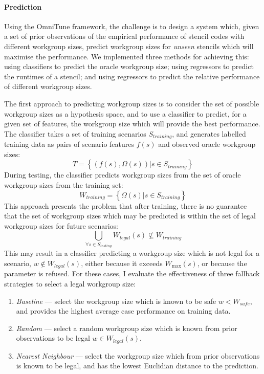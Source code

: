 \documentclass[nonatbib,preprint,9pt]{sigplanconf}
\begin{document}
\paragraph{Prediction} Using the OmniTune framework, the challenge is
to design a system which, given a set of prior observations of the
empirical performance of stencil codes with different workgroup sizes,
predict workgroup sizes for \emph{unseen} stencils which will maximise
the performance. We implemented three methods for achieving this:
using classifiers to predict the oracle workgroup size; using
regressors to predict the runtimes of a stencil; and using regressors
to predict the relative performance of different workgroup sizes.

The first approach to predicting workgroup
sizes is to consider the set of possible workgroup sizes as a
hypothesis space, and to use a classifier to predict, for a given set
of features, the workgroup size which will provide the best
performance. The classifier takes a set of training scenarios
$S_{training}$, and generates labelled training data as pairs of
scenario features $f(s)$ and observed oracle workgroup sizes:
%
\begin{equation}
  T = \left\{ \left(f(s), \Omega(s)\right) | s \in S_{training} \right\}
\end{equation}
%
During testing, the classifier predicts workgroup sizes from the set
of oracle workgroup sizes from the training set:
%
\begin{equation}
  W_{training} = \left\{ \Omega(s) | s \in S_{training} \right\}
\end{equation}
%
This approach presents the problem that after training, there is no
guarantee that the set of workgroup sizes which may be predicted is
within the set of legal workgroup sizes for future scenarios:
%
\begin{equation}
  \bigcup_{\forall s \in S_{testing}} W_{legal}(s) \nsubseteq W_{training}
\end{equation}
%
This may result in a classifier predicting a workgroup size which is
not legal for a scenario, $w \not\in W_{legal}(s)$, either because it
exceeds $W_{\max}(s)$, or because the parameter is refused. For these
cases, I evaluate the effectiveness of three fallback strategies to
select a legal workgroup size:
%
\begin{enumerate}
\item \emph{Baseline} --- select the workgroup size which is known to
  be safe $w < W_{safe}$, and provides the highest average case
  performance on training data.
\item \emph{Random} --- select a random workgroup size which is known
  from prior observations to be legal $w \in W_{legal}(s)$.
\item \emph{Nearest Neighbour} --- select the workgroup size which
  from prior observations is known to be legal, and has the lowest
  Euclidian distance to the prediction.
\end{enumerate}
\end{document}
